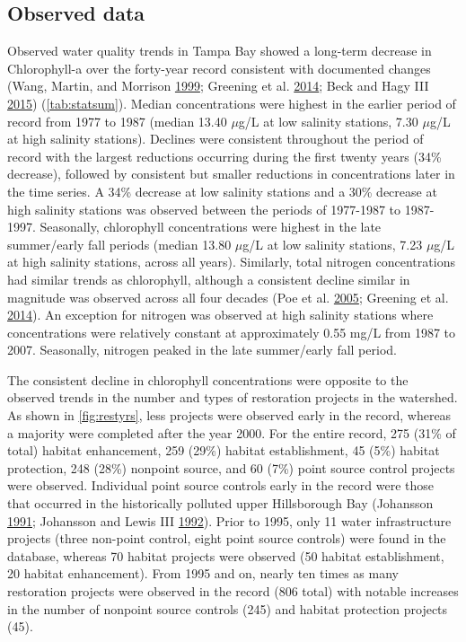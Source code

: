\documentclass[]{article}
\begin{document}
\hypertarget{observed-data}{%
\subsection{Observed data}\label{observed-data}}

Observed water quality trends in Tampa Bay showed a long-term decrease
in Chlorophyll-a over the forty-year record consistent with documented
changes (Wang, Martin, and Morrison
\protect\hyperlink{ref-Wang99}{1999}; Greening et al.
\protect\hyperlink{ref-Greening2014}{2014}; Beck and Hagy III
\protect\hyperlink{ref-Beck15}{2015}) (\cref{tab:statsum}). Median
concentrations were highest in the earlier period of record from 1977 to
1987 (median 13.40 \(\mu\)g/L at low salinity stations, 7.30 \(\mu\)g/L
at high salinity stations). Declines were consistent throughout the
period of record with the largest reductions occurring during the first
twenty years (34\% decrease), followed by consistent but smaller
reductions in concentrations later in the time series. A 34\% decrease
at low salinity stations and a 30\% decrease at high salinity stations
was observed between the periods of 1977-1987 to 1987-1997. Seasonally,
chlorophyll concentrations were highest in the late summer/early fall
periods (median 13.80 \(\mu\)g/L at low salinity stations, 7.23
\(\mu\)g/L at high salinity stations, across all years). Similarly,
total nitrogen concentrations had similar trends as chlorophyll,
although a consistent decline similar in magnitude was observed across
all four decades (Poe et al. \protect\hyperlink{ref-Poe05}{2005};
Greening et al. \protect\hyperlink{ref-Greening2014}{2014}). An
exception for nitrogen was observed at high salinity stations where
concentrations were relatively constant at approximately 0.55 mg/L from
1987 to 2007. Seasonally, nitrogen peaked in the late summer/early fall
period.

The consistent decline in chlorophyll concentrations were opposite to
the observed trends in the number and types of restoration projects in
the watershed. As shown in \cref{fig:restyrs}, less projects were
observed early in the record, whereas a majority were completed after
the year 2000. For the entire record, 275 (31\% of total) habitat
enhancement, 259 (29\%) habitat establishment, 45 (5\%) habitat
protection, 248 (28\%) nonpoint source, and 60 (7\%) point source
control projects were observed. Individual point source controls early
in the record were those that occurred in the historically polluted
upper Hillsborough Bay (Johansson
\protect\hyperlink{ref-Johansson91}{1991}; Johansson and Lewis III
\protect\hyperlink{ref-Johansson92}{1992}). Prior to 1995, only 11 water
infrastructure projects (three non-point control, eight point source
controls) were found in the database, whereas 70 habitat projects were
observed (50 habitat establishment, 20 habitat enhancement). From 1995
and on, nearly ten times as many restoration projects were observed in
the record (806 total) with notable increases in the number of nonpoint
source controls (245) and habitat protection projects (45).
\end{document}
